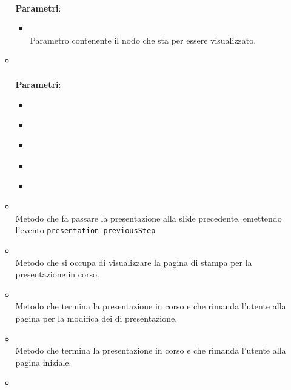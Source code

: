 \begin{itemize}
\begin{itemize}
\\ \textbf{Parametri}:
\begin{itemize}
\item {}
\\ Parametro contenente il nodo che sta per essere visualizzato.
\end{itemize}
\item {}
\\ \dpConstructor
\\ \textbf{Parametri}:
\begin{itemize}
\item {}
\\ \dpScopeParam
\item {}
\\ \dpMDSidenavServiceParam
\item {}
\\ \dpRouteParamsParam
\item {}
\\ \dpPresentationServiceParam
\item {}
\\ \dpProjectServiceParam
\end{itemize}
\item {}
\\ Metodo che fa passare la presentazione alla slide precedente, emettendo l'evento \texttt{presentation-previousStep}
\item {}
\\ Metodo che si occupa di visualizzare la pagina di stampa per la presentazione in corso.
\item {}
\\ Metodo che termina la presentazione in corso e che rimanda l'utente alla pagina per la modifica dei  di presentazione.
\item {}
\\ Metodo che termina la presentazione in corso e che rimanda l'utente alla pagina iniziale.
\item {}

\end{itemize}
\end{itemize}
